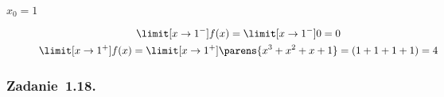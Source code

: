 \begin{enumerate}[label={\alph*)}]
        \begin{description}
            \item[\(x_0 = 1\)]
                \begin{gather*}
                    \limit[x \to 1^-] f(x)
                        = \limit[x \to 1^-] 0
                        = 0\\
                    \limit[x \to 1^+] f(x)
                        = \limit[x \to 1^+] \parens{x^3 + x^2 + x + 1}
                        = (1 + 1 + 1 + 1)
                        = 4
                \end{gather*}
        \end{description}
\end{enumerate}
\subsubsection*{Zadanie~1.18.}
